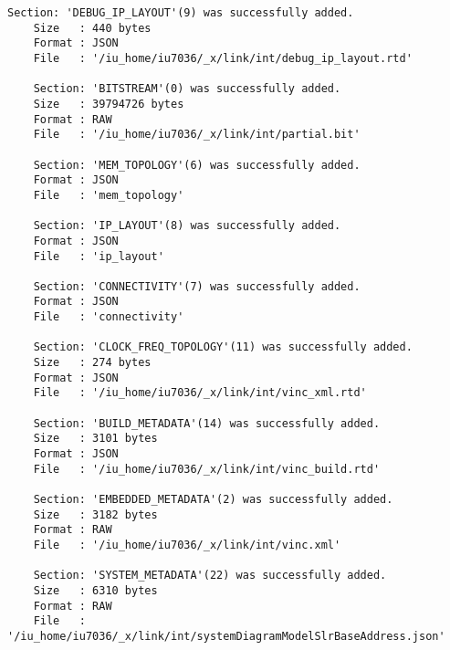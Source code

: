 \begin{lstlisting}[caption=Содержимое файла v++\_vinc.log для измененного проекта, label={log2}]
	Section: 'DEBUG_IP_LAYOUT'(9) was successfully added.
	Size   : 440 bytes
	Format : JSON
	File   : '/iu_home/iu7036/_x/link/int/debug_ip_layout.rtd'
	
	Section: 'BITSTREAM'(0) was successfully added.
	Size   : 39794726 bytes
	Format : RAW
	File   : '/iu_home/iu7036/_x/link/int/partial.bit'
	
	Section: 'MEM_TOPOLOGY'(6) was successfully added.
	Format : JSON
	File   : 'mem_topology'
	
	Section: 'IP_LAYOUT'(8) was successfully added.
	Format : JSON
	File   : 'ip_layout'
	
	Section: 'CONNECTIVITY'(7) was successfully added.
	Format : JSON
	File   : 'connectivity'
	
	Section: 'CLOCK_FREQ_TOPOLOGY'(11) was successfully added.
	Size   : 274 bytes
	Format : JSON
	File   : '/iu_home/iu7036/_x/link/int/vinc_xml.rtd'
	
	Section: 'BUILD_METADATA'(14) was successfully added.
	Size   : 3101 bytes
	Format : JSON
	File   : '/iu_home/iu7036/_x/link/int/vinc_build.rtd'
	
	Section: 'EMBEDDED_METADATA'(2) was successfully added.
	Size   : 3182 bytes
	Format : RAW
	File   : '/iu_home/iu7036/_x/link/int/vinc.xml'
	
	Section: 'SYSTEM_METADATA'(22) was successfully added.
	Size   : 6310 bytes
	Format : RAW
	File   : '/iu_home/iu7036/_x/link/int/systemDiagramModelSlrBaseAddress.json'
	

\end{lstlisting}

